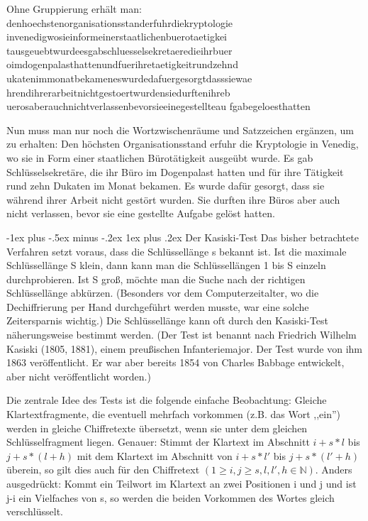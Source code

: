\documentclass[a4paper]{article}
\makeatletter
\renewcommand{\subsubsection}{\@startsection{subsubsection}{3}{0mm}%
 {-1ex plus -.5ex minus -.2ex}%
 {1ex plus .2ex}%
 {\normalfont\small\bfseries}}
\makeatother
\begin{document}
\begin{multicols}{3}
    Ohne Gruppierung erhält man:
    denhoechstenorganisationsstanderfuhrdiekryptologie
    invenedigwosieinformeinerstaatlichenbuerotaetigkei
    tausgeuebtwurdeesgabschluesselsekretaeredieihrbuer
    oimdogenpalasthattenundfuerihretaetigkeitrundzehnd
    ukatenimmonatbekameneswurdedafuergesorgtdasssiewae
    hrendihrerarbeitnichtgestoertwurdensiedurftenihreb
    uerosaberauchnichtverlassenbevorsieeinegestellteau
    fgabegeloesthatten

    Nun muss man nur noch die Wortzwischenräume und Satzzeichen ergänzen, um zu erhalten:
    Den höchsten Organisationsstand erfuhr die Kryptologie in Venedig, wo sie in Form einer staatlichen Bürotätigkeit ausgeübt wurde. Es gab Schlüsselsekretäre, die ihr Büro im Dogenpalast hatten und für ihre Tätigkeit rund zehn Dukaten im Monat bekamen. Es wurde dafür gesorgt, dass sie während ihrer Arbeit nicht gestört wurden. Sie durften ihre Büros aber auch nicht verlassen, bevor sie eine gestellte Aufgabe gelöst hatten.

    \subsubsection{Der Kasiski-Test}
    Das bisher betrachtete Verfahren setzt voraus, dass die Schlüssellänge s bekannt ist. Ist die maximale Schlüssellänge S klein, dann kann man die Schlüssellängen 1 bis S einzeln durchprobieren. Ist S groß, möchte man die Suche nach der richtigen Schlüssellänge abkürzen. (Besonders vor dem Computerzeitalter, wo die Dechiffrierung per Hand durchgeführt werden musste, war eine solche Zeitersparnis wichtig.) Die Schlüssellänge kann oft durch den Kasiski-Test näherungsweise bestimmt werden. (Der Test ist benannt nach Friedrich Wilhelm Kasiski (1805, 1881), einem preußischen Infanteriemajor. Der Test wurde von ihm 1863 veröffentlicht. Er war aber bereits 1854 von Charles Babbage entwickelt, aber nicht veröffentlicht worden.)

    Die zentrale Idee des Tests ist die folgende einfache Beobachtung: Gleiche Klartextfragmente, die eventuell mehrfach vorkommen (z.B. das Wort ,,ein'') werden in gleiche Chiffretexte übersetzt, wenn sie unter dem gleichen Schlüsselfragment liegen. Genauer: Stimmt der Klartext im Abschnitt $i+s*l$ bis $j+s*(l+h)$ mit dem Klartext im Abschnitt von $i+s*l'$ bis $j+s*(l'+h)$ überein, so gilt dies auch für den Chiffretext $(1\geq i,j\geq s,l,l',h\in\mathbb{N})$.
    Anders ausgedrückt: Kommt ein Teilwort im Klartext an zwei Positionen i und j und ist j-i ein Vielfaches von s, so werden die beiden Vorkommen des Wortes gleich verschlüsselt.


\end{multicols}
\end{document}
